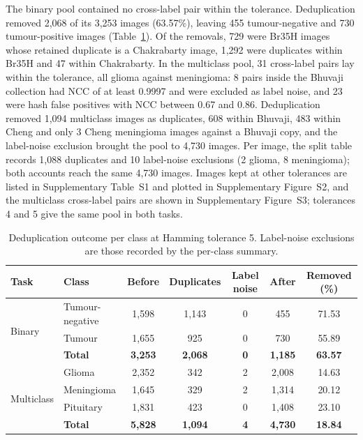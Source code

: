 \documentclass[final,3p,times,number]{elsarticle}
\begin{document}
The binary pool contained no cross-label pair within the tolerance. Deduplication removed 2,068 of its 3,253 images (63.57\%), leaving 455 tumour-negative and 730 tumour-positive images (Table~\ref{tab:dedup}). Of the removals, 729 were Br35H images whose retained duplicate is a Chakrabarty image, 1,292 were duplicates within Br35H and 47 within Chakrabarty. In the multiclass pool, 31 cross-label pairs lay within the tolerance, all glioma against meningioma: 8 pairs inside the Bhuvaji collection had NCC of at least 0.9997 and were excluded as label noise, and 23 were hash false positives with NCC between 0.67 and 0.86. Deduplication removed 1,094 multiclass images as duplicates, 608 within Bhuvaji, 483 within Cheng and only 3 Cheng meningioma images against a Bhuvaji copy, and the label-noise exclusion brought the pool to 4,730 images. Per image, the split table records 1,088 duplicates and 10 label-noise exclusions (2 glioma, 8 meningioma); both accounts reach the same 4,730 images. Images kept at other tolerances are listed in Supplementary Table~S1 and plotted in Supplementary Figure~S2, and the multiclass cross-label pairs are shown in Supplementary Figure~S3; tolerances 4 and 5 give the same pool in both tasks.

\begin{table}[htbp]
\centering
\caption{Deduplication outcome per class at Hamming tolerance 5. Label-noise exclusions are those recorded by the per-class summary.}
\label{tab:dedup}
\small
\begin{tabular*}{\textwidth}{@{\extracolsep{\fill}}llccccc@{}}
\toprule
Task & Class & Before & Duplicates & Label noise & After & Removed (\%) \\
\midrule
\multirow{3}{*}{Binary} & Tumour-negative & 1,598 & 1,143 & 0 & 455 & 71.53 \\
 & Tumour & 1,655 & 925 & 0 & 730 & 55.89 \\
 & \textbf{Total} & \textbf{3,253} & \textbf{2,068} & \textbf{0} & \textbf{1,185} & \textbf{63.57} \\
\midrule
\multirow{4}{*}{Multiclass} & Glioma & 2,352 & 342 & 2 & 2,008 & 14.63 \\
 & Meningioma & 1,645 & 329 & 2 & 1,314 & 20.12 \\
 & Pituitary & 1,831 & 423 & 0 & 1,408 & 23.10 \\
 & \textbf{Total} & \textbf{5,828} & \textbf{1,094} & \textbf{4} & \textbf{4,730} & \textbf{18.84} \\
\bottomrule
\end{tabular*}
\end{table}
\end{document}
